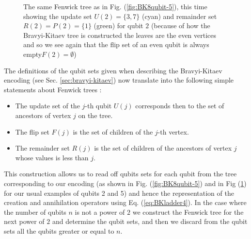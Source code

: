 \begin{figure}
\centering
{}
\caption{The same Fenwick tree as in Fig. (\ref{fig:BK8qubit-5}), this time showing the update set $U(2) = \{3, 7\}$ (cyan) and remainder set $R(2) = P(2) = \{1\}$ (green) for qubit $2$ (because of how the Bravyi-Kitaev tree is constructed the leaves are the even vertices and so we see again that the flip set of an even qubit is always empty$F(2) = \emptyset$)}
\label{fig:BK8qubit-2}
\end{figure}

The definitions of the qubit sets given when describing the Bravyi-Kitaev encoding (see Sec. \ref{sec:bravyi-kitaev}) now translate into the following simple statements about Fenwick trees \cite{Havlek2017}:
\begin{itemize}
\item The update set of the $j$-th qubit $U(j)$ corresponds then to the set of ancestors of vertex $j$ on the tree.
\item The flip set $F(j)$ is the set of children of the $j$-th vertex.
\item The remainder set $R(j)$ is the set of children of the ancestors of vertex $j$ whose values is less than $j$.
\end{itemize}
This construction allows us to read off qubits sets for each qubit from the tree corresponding to our encoding (as shown in Fig. (\ref{fig:BK8qubit-5}) and in Fig (\ref{fig:BK8qubit-2}) for our usual examples of qubits 2 and 5) and hence the representation of the creation and annihilation operators using Eq. (\ref{eq:BKladder4}). In the case where the number of qubits $n$ is not a power of $2$ we construct the Fenwick tree for the next power of $2$ and determine the qubit sets, and then we discard from the qubit sets all the qubits greater or equal to $n$.

